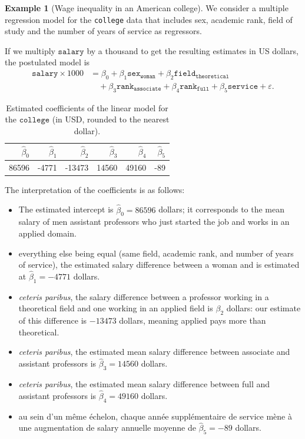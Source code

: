 \documentclass[
  11pt,
  letterpaper,
]{book}
\providecommand{\tightlist}{%
  \setlength{\itemsep}{0pt}\setlength{\parskip}{0pt}}
\theoremstyle{definition}
\theoremstyle{definition}
\newtheorem{example}{Example}[chapter]
\theoremstyle{definition}
\theoremstyle{definition}
\theoremstyle{remark}
\begin{document}
\begin{example}[Wage inequality in an American college]
\protect\hypertarget{exm:inequite-salariale}{}\label{exm:inequite-salariale}We consider a multiple regression model for the \texttt{college} data that includes sex, academic rank, field of study and the number of years of service as regressors.
\end{example}

If we multiply \(\texttt{salary}\) by a thousand to get the resulting estimates in US dollars, the postulated model is
\begin{align*}
\texttt{salary}\times 1000 &= \beta_0 + \beta_1 \texttt{sex}_{\texttt{woman}} +\beta_2 \texttt{field}_{\texttt{theoretical}} \\&\quad +\beta_3 \texttt{rank}_{\texttt{associate}}
+\beta_4 \texttt{rank}_{\texttt{full}}  +\beta_5 \texttt{service} + \varepsilon.
\end{align*}

\begin{table}

\caption{\label{tab:collegecoefs}Estimated coefficients of the linear model for the $\texttt{college}$ (in USD, rounded to the nearest dollar).}
\centering
\begin{tabular}[t]{rrrrrr}
\toprule
$\widehat{\beta}_0$ & $\widehat{\beta}_1$ & $\widehat{\beta}_2$ & $\widehat{\beta}_3$ & $\widehat{\beta}_4$ & $\widehat{\beta}_5$\\
\midrule
86596 & -4771 & -13473 & 14560 & 49160 & -89\\
\bottomrule
\end{tabular}
\end{table}

The interpretation of the coefficients is as follows:

\begin{itemize}
\tightlist
\item
  The estimated intercept is \(\widehat{\beta}_0=86596\) dollars; it corresponds to the mean salary of men assistant professors who just started the job and works in an applied domain.
\item
  everything else being equal (same field, academic rank, and number of years of service), the estimated salary difference between a woman and is estimated at \(\widehat{\beta}_1=-4771\) dollars.
\item
  \emph{ceteris paribus}, the salary difference between a professor working in a theoretical field and one working in an applied field is \(\beta_2\) dollars: our estimate of this difference is \(-13473\) dollars, meaning applied pays more than theoretical.
\item
  \emph{ceteris paribus}, the estimated mean salary difference between associate and assistant professors is \(\widehat{\beta}_3=14560\) dollars.
\item
  \emph{ceteris paribus}, the estimated mean salary difference between full and assistant professors is \(\widehat{\beta}_4=49160\) dollars.
\item
  au sein d'un même échelon, chaque année supplémentaire de service mène à une augmentation de salary annuelle moyenne de \(\widehat{\beta}_5=-89\) dollars.
\end{itemize}
\end{document}
